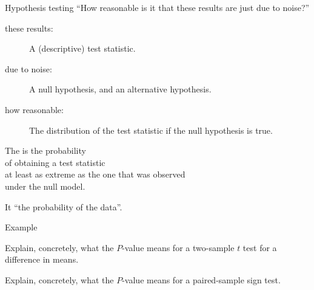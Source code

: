 \begin{frame}{Hypothesis testing}
    \alert{``How reasonable is it that these results are just due to noise?''}

    \begin{description}
        \item[these results:] A (descriptive) test statistic.  
        \item[due to noise:] A null hypothesis, and an alternative hypothesis.
        \item[how reasonable:] The distribution of the test statistic if the null hypothesis is true. 
    \end{description}

    \vspace{2em}
    \pause

    The  is the probability \\
    of obtaining a test statistic \\
    at least as extreme as the one that was observed\\
    under the null model.

    \vspace{2em}
    \pause

    It  ``the probability of the data''.

\end{frame}

\begin{frame}{Example}

    Explain, concretely, what the $P$-value means for a two-sample $t$ test
    for a difference in means.
    \vfill

    Explain, concretely, what the $P$-value means for a paired-sample sign test.
    \vfill
    
\end{frame}

